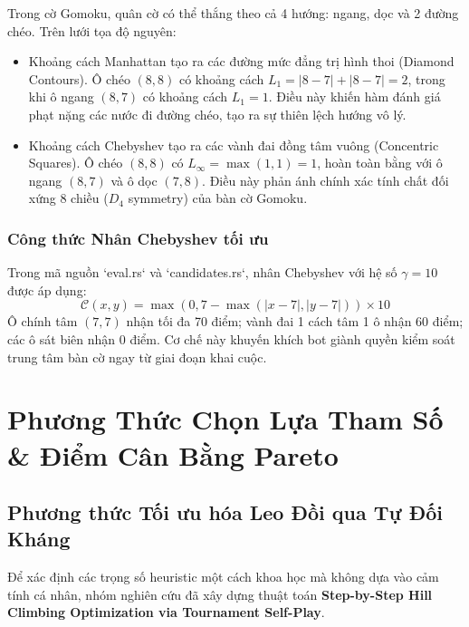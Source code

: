 \documentclass[11pt,a4paper]{report}
\begin{document}
Trong cờ Gomoku, quân cờ có thể thắng theo cả 4 hướng: ngang, dọc và 2 đường chéo. Trên lưới tọa độ nguyên:
\begin{itemize}
    \item Khoảng cách Manhattan tạo ra các đường mức đẳng trị hình thoi (Diamond Contours). Ô chéo $(8, 8)$ có khoảng cách $L_1 = |8-7| + |8-7| = 2$, trong khi ô ngang $(8, 7)$ có khoảng cách $L_1 = 1$. Điều này khiến hàm đánh giá phạt nặng các nước đi đường chéo, tạo ra sự thiên lệch hướng vô lý.
    \item Khoảng cách Chebyshev tạo ra các vành đai đồng tâm vuông (Concentric Squares). Ô chéo $(8, 8)$ có $L_\infty = \max(1, 1) = 1$, hoàn toàn bằng với ô ngang $(8, 7)$ và ô dọc $(7, 8)$. Điều này phản ánh chính xác tính chất đối xứng 8 chiều ($D_4$ symmetry) của bàn cờ Gomoku.
\end{itemize}

\subsection{Công thức Nhân Chebyshev tối ưu}
Trong mã nguồn `eval.rs` và `candidates.rs`, nhân Chebyshev với hệ số $\gamma = 10$ được áp dụng:
\begin{equation}
    \mathcal{C}(x, y) = \max\left(0, 7 - \max(|x - 7|, |y - 7|)\right) \times 10
\end{equation}
Ô chính tâm $(7, 7)$ nhận tối đa 70 điểm; vành đai 1 cách tâm 1 ô nhận 60 điểm; các ô sát biên nhận 0 điểm. Cơ chế này khuyến khích bot giành quyền kiểm soát trung tâm bàn cờ ngay từ giai đoạn khai cuộc.

\chapter{Phương Thức Chọn Lựa Tham Số \& Điểm Cân Bằng Pareto}

\section{Phương thức Tối ưu hóa Leo Đồi qua Tự Đối Kháng}

Để xác định các trọng số heuristic một cách khoa học mà không dựa vào cảm tính cá nhân, nhóm nghiên cứu đã xây dựng thuật toán \textbf{Step-by-Step Hill Climbing Optimization via Tournament Self-Play}.
\end{document}
